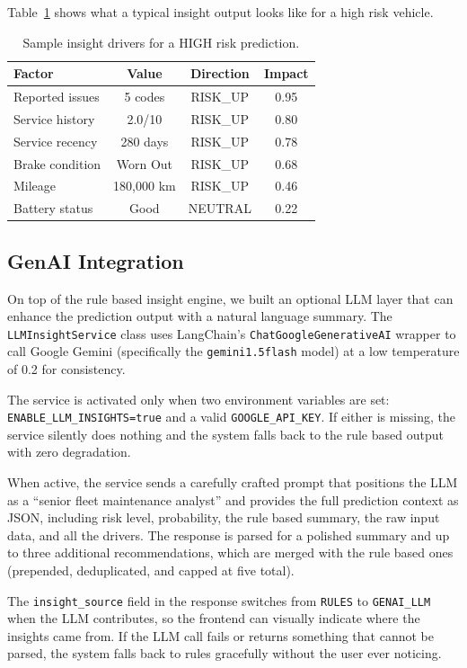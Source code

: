 \documentclass[conference]{IEEEtran}
\begin{document}
Table~\ref{tab:insight_example} shows what a typical insight output looks like for a high risk vehicle.

\begin{table}[H]
\centering
\caption{Sample insight drivers for a HIGH risk prediction.}
\label{tab:insight_example}
\begin{tabular}{lccc}
\toprule
Factor & Value & Direction & Impact \\
\midrule
Reported issues & 5 codes & RISK\_UP & 0.95 \\
Service history & 2.0/10 & RISK\_UP & 0.80 \\
Service recency & 280 days & RISK\_UP & 0.78 \\
Brake condition & Worn Out & RISK\_UP & 0.68 \\
Mileage & 180,000 km & RISK\_UP & 0.46 \\
Battery status & Good & NEUTRAL & 0.22 \\
\bottomrule
\end{tabular}
\end{table}

\subsection{GenAI Integration}

On top of the rule based insight engine, we built an optional LLM layer that can enhance the prediction output with a natural language summary. The \texttt{LLMInsightService} class uses LangChain's \texttt{ChatGoogleGenerativeAI} wrapper to call Google Gemini (specifically the \texttt{gemini\text{-}1.5\text{-}flash} model) at a low temperature of 0.2 for consistency.

The service is activated only when two environment variables are set: \texttt{ENABLE\_LLM\_INSIGHTS=true} and a valid \texttt{GOOGLE\_API\_KEY}. If either is missing, the service silently does nothing and the system falls back to the rule based output with zero degradation.

When active, the service sends a carefully crafted prompt that positions the LLM as a ``senior fleet maintenance analyst'' and provides the full prediction context as JSON, including risk level, probability, the rule based summary, the raw input data, and all the drivers. The response is parsed for a polished summary and up to three additional recommendations, which are merged with the rule based ones (prepended, deduplicated, and capped at five total).

The \texttt{insight\_source} field in the response switches from \texttt{RULES} to \texttt{GENAI\_LLM} when the LLM contributes, so the frontend can visually indicate where the insights came from. If the LLM call fails or returns something that cannot be parsed, the system falls back to rules gracefully without the user ever noticing.
\end{document}

